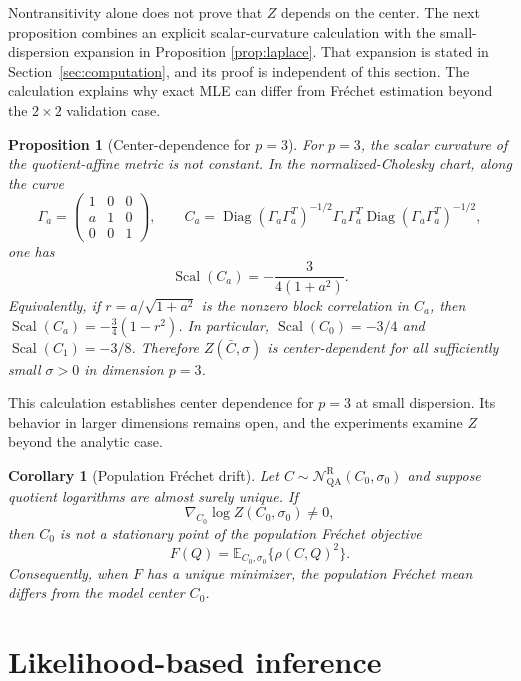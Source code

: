 \documentclass[
  12pt]{article}
\newcommand{\Diag}{\operatorname{Diag}}
\newcommand{\Scal}{\operatorname{Scal}}
\newcommand{\E}{\mathbb E}
\newcommand{\NR}{\mathcal N^{\mathrm R}_{\mathrm{QA}}}
\newtheorem{proposition}{Proposition}
\newtheorem{corollary}{Corollary}
\begin{document}
Nontransitivity alone does not prove that $Z$ depends on the center. The next proposition combines an explicit scalar-curvature calculation with the small-dispersion expansion in Proposition \ref{prop:laplace}. That expansion is stated in Section~\ref{sec:computation}, and its proof is independent of this section. The calculation explains why exact MLE can differ from Fr\'echet estimation beyond the $2\times2$ validation case.

\begin{proposition}[Center-dependence for $p=3$]\label{prop:center_dependence}
For $p=3$, the scalar curvature of the quotient-affine metric is not constant. In the normalized-Cholesky chart, along the curve
\[
\Gamma_a=\begin{pmatrix}1&0&0\\ a&1&0\\0&0&1\end{pmatrix},
\qquad
C_a=\Diag(\Gamma_a\Gamma_a^T)^{-1/2}\Gamma_a\Gamma_a^T\Diag(\Gamma_a\Gamma_a^T)^{-1/2},
\]
one has
\begin{equation}\label{eq:scalar_curve}
\Scal(C_a)=-\frac{3}{4(1+a^2)}.
\end{equation}
Equivalently, if $r=a/\sqrt{1+a^2}$ is the nonzero block correlation in $C_a$, then $\Scal(C_a)=-\tfrac34(1-r^2)$. In particular, $\Scal(C_0)=-3/4$ and $\Scal(C_1)=-3/8$. Therefore $Z(\bar C,\sigma)$ is center-dependent for all sufficiently small $\sigma>0$ in dimension $p=3$.
\end{proposition}

This calculation establishes center dependence for $p=3$ at small dispersion. Its behavior in larger dimensions remains open, and the experiments examine $Z$ beyond the analytic case.

\begin{corollary}[Population Fr\'echet drift]\label{cor:frechet_drift}
Let $C\sim\NR(C_0,\sigma_0)$ and suppose quotient logarithms are almost surely unique. If
\[
\nabla_{C_0}\log Z(C_0,\sigma_0)\ne0,
\]
then $C_0$ is not a stationary point of the population Fr\'echet objective
\[
F(Q)=\E_{C_0,\sigma_0}\{\rho(C,Q)^2\}.
\]
Consequently, when $F$ has a unique minimizer, the population Fr\'echet mean differs from the model center $C_0$. 
\end{corollary}

\section{Likelihood-based inference}\label{sec:likelihood}
\end{document}
